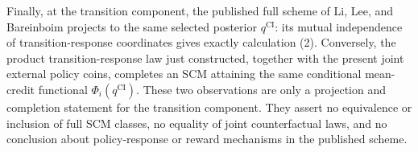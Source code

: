 Finally, at the transition component, the published full scheme of Li, Lee, and Bareinboim projects to the same selected posterior \(q^{\mathrm{CI}}\): its mutual independence of transition-response coordinates gives exactly calculation (2).  Conversely, the product transition-response law just constructed, together with the present joint external policy coins, completes an SCM attaining the same conditional mean-credit functional \(\Phi_i(q^{\mathrm{CI}})\).  These two observations are only a projection and completion statement for the transition component.  They assert no equivalence or inclusion of full SCM classes, no equality of joint counterfactual laws, and no conclusion about policy-response or reward mechanisms in the published scheme.